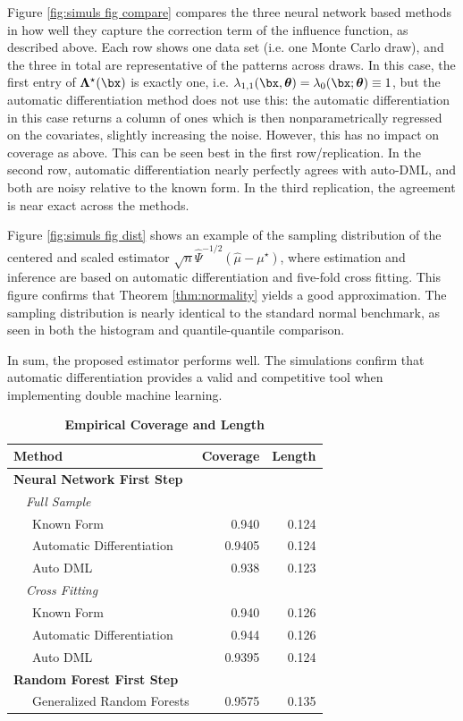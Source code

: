 \documentclass[12pt]{article}
\numberwithin{equation}{section}
\theoremstyle{definition}
\newcommand{\btheta}{\boldsymbol{\theta}}
\newcommand{\bL}{\boldsymbol{\Lambda}}
\newcommand{\mtrue}{\mu^\star}
\newcommand{\bLtrue}{\bL^\star}
\newcommand{\mhat}{\widehat{\mu}}
\newcommand{\Psihat}{\widehat{\Psi}}
\begin{document}
\begin{appendices}
Figure \ref{fig:simuls fig compare} compares the three neural network based methods in how well they capture the correction term of the influence function, as described above. Each row shows one data set (i.e. one Monte Carlo draw), and the three in total are representative of the patterns across draws. In this case, the first entry of $\bLtrue(\bx)$ is exactly one, i.e. $\lambda_{1,1}(\bx, \btheta) = \lambda_0(\bx; \btheta) \equiv 1$, but the automatic differentiation method does not use this: the automatic differentiation in this case returns a column of ones which is then nonparametrically regressed on the covariates, slightly increasing the noise. However, this has no impact on coverage as above. This can be seen best in the first row/replication. In the second row, automatic differentiation nearly perfectly agrees with auto-DML, and both are noisy relative to the known form.  In the third replication, the agreement is near exact across the methods.

Figure \ref{fig:simuls fig dist} shows an example of the sampling distribution of the centered and scaled estimator $\sqrt{n}\Psihat^{-1/2}(\mhat - \mtrue)$, where estimation and inference are based on automatic differentiation and five-fold cross fitting. This figure confirms that Theorem \ref{thm:normality} yields a good approximation. The sampling distribution is nearly identical to the standard normal benchmark, as seen in both the histogram and quantile-quantile comparison. 

In sum, the proposed estimator performs well. The simulations confirm that automatic differentiation provides a valid and competitive tool when implementing double machine learning. 


\begin{table}[ht]
    \renewcommand{\arraystretch}{1.12}
    \begin{center}
    \caption{
        {\bf Empirical Coverage and Length}
        \label{table:simuls table}
    }
    \begin{tabular}{lrr}
    Method & Coverage & Length \\
    \hline
    \multicolumn{3}{l}{\bfseries Neural Network First Step} \tabularnewline
    ~~\emph{Full Sample}&&\tabularnewline
    ~~~Known Form & 0.940 & 0.124\tabularnewline
    ~~~Automatic Differentiation & 0.9405 & 0.124\tabularnewline
    ~~~Auto DML & 0.938 & 0.123\tabularnewline
    ~~\emph{Cross Fitting}&&\tabularnewline
    ~~~Known Form & 0.940 & 0.126\tabularnewline
    ~~~Automatic Differentiation & 0.944 & 0.126\tabularnewline
    ~~~Auto DML & 0.9395 & 0.124\tabularnewline
    \hline
    \multicolumn{3}{l}{\bfseries Random Forest First Step} \tabularnewline
    ~~~Generalized Random Forests & 0.9575 & 0.135\tabularnewline
    \hline
    \end{tabular} 
    \end{center}
\end{table}






\end{appendices}
\end{document}
